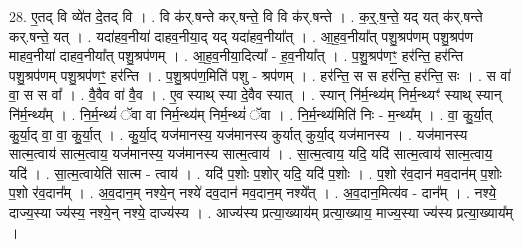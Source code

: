 \documentclass[17pt]{extarticle}
\begin{document}
28. ए॒तद् वि व्ये॑त दे॒तद् वि । . वि क॑र्.षन्ते कर्.षन्ते॒ वि वि क॑र्.षन्ते । . क॒र्॒.ष॒न्ते॒ यद् यत् क॑र्.षन्ते कर्.षन्ते॒ यत् । . यदा॑हव॒नीया॑ दाहव॒नीया॒द् यद् यदा॑हव॒नीया᳚त् । . आ॒ह॒व॒नीया᳚त् पशु॒श्रप॑णम् पशु॒श्रप॑ण माहव॒नीया॑ दाहव॒नीया᳚त् पशु॒श्रप॑णम् । . आ॒ह॒व॒नीया॒दित्या᳚ - ह॒व॒नीया᳚त् । . प॒शु॒श्रप॑णꣳ॒॒ हर॑न्ति॒ हर॑न्ति पशु॒श्रप॑णम् पशु॒श्रप॑णꣳ॒॒ हर॑न्ति । . प॒शु॒श्रप॑ण॒मिति॑ पशु - श्रप॑णम् । . हर॑न्ति॒ स स हर॑न्ति॒ हर॑न्ति॒ सः । . स वा॑ वा॒ स स वा᳚ । . वै॒वैव वा॑ वै॒व । . ए॒व स्याथ् स्या दे॒वैव स्यात् । . स्यान् नि॑र्म॒न्थ्य॑म् निर्म॒न्थ्यꣳ॑ स्याथ् स्यान् नि॑र्म॒न्थ्य᳚म् । . नि॒र्म॒न्थ्यं॑ ॅवा वा निर्म॒न्थ्य॑म् निर्म॒न्थ्यं॑ ॅवा । . नि॒र्म॒न्थ्य॑मिति॑ निः - म॒न्थ्य᳚म् । . वा॒ कु॒र्या॒त् कु॒र्या॒द् वा॒ वा॒ कु॒र्या॒त् । . कु॒र्या॒द् यज॑मानस्य॒ यज॑मानस्य कुर्यात् कुर्या॒द् यज॑मानस्य । . यज॑मानस्य सात्म॒त्वाय॑ सात्म॒त्वाय॒ यज॑मानस्य॒ यज॑मानस्य सात्म॒त्वाय॑ । . सा॒त्म॒त्वाय॒ यदि॒ यदि॑ सात्म॒त्वाय॑ सात्म॒त्वाय॒ यदि॑ । . सा॒त्म॒त्वायेति॑ सात्म - त्वाय॑ । . यदि॑ प॒शोः प॒शोर् यदि॒ यदि॑ प॒शोः । . प॒शो र॑व॒दान॑ मव॒दान॑म् प॒शोः प॒शो र॑व॒दान᳚म् । . अ॒व॒दान॒म् नश्ये॒न् नश्ये॑ दव॒दान॑ मव॒दान॒म् नश्ये᳚त् । . अ॒व॒दान॒मित्य॑व - दान᳚म् । . नश्ये॒ दाज्य॒स्या ज्य॑स्य॒ नश्ये॒न् नश्ये॒ दाज्य॑स्य । . आज्य॑स्य प्रत्या॒ख्याय॑म् प्रत्या॒ख्याय॒ माज्य॒स्या ज्य॑स्य प्रत्या॒ख्याय᳚म् । \newline
\end{document}
